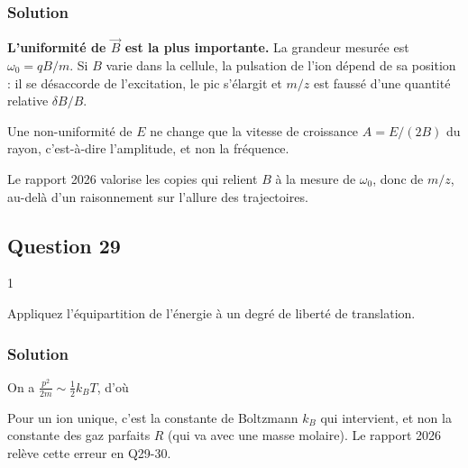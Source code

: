 \documentclass[11pt,a4paper]{article}
\newcommand{\equationajustee}[1]{%
  \sbox{\boiteequation}{$\displaystyle #1$}%
  \ifdim\wd\boiteequation>\linewidth
    \[\resizebox{\linewidth}{!}{\usebox{\boiteequation}}\]%
  \else
    \[#1\]%
  \fi}
\begin{document}
\hypertarget{solution-27}{%
\subsubsection{Solution}\label{solution-27}}

\textbf{L'uniformité de \(\vec B\) est la plus importante.} La grandeur mesurée est \(\omega_0=qB/m\). Si \(B\) varie dans la cellule, la pulsation de l'ion dépend de sa position : il se désaccorde de l'excitation, le pic s'élargit et \(m/z\) est faussé d'une quantité relative \(\delta B/B\).

Une non-uniformité de \(E\) ne change que la vitesse de croissance \(A=E/(2B)\) du rayon, c'est-à-dire l'amplitude, et non la fréquence.

\begin{jury}

Le rapport 2026 valorise les copies qui relient \(B\) à la mesure de \(\omega_0\), donc de \(m/z\), au-delà d'un raisonnement sur l'allure des trajectoires.

\end{jury}

\hypertarget{question-29}{%
\subsection{Question 29}\label{question-29}}

\begin{indication}{1}

Appliquez l'équipartition de l'énergie à un degré de liberté de translation.

\end{indication}

\hypertarget{solution-28}{%
\subsubsection{Solution}\label{solution-28}}

On a \(\frac{p^2}{2m}\sim\frac12k_BT\), d'où

\equationajustee{\boxed{p\sim\sqrt{mk_BT}}}

\begin{piege}

Pour un ion unique, c'est la constante de Boltzmann \(k_B\) qui intervient, et non la constante des gaz parfaits \(R\) (qui va avec une masse molaire). Le rapport 2026 relève cette erreur en Q29-30.

\end{piege}
\end{document}
